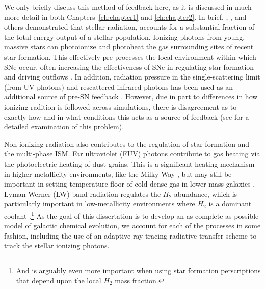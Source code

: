 We only briefly discuss this method of feedback here, as it is discussed in much more detail in both Chapters~\ref{ch:chapter1} and \ref{ch:chapter2}. In brief, \cite{Leitherer1999}, \cite{Agertz2013}, and others demonstrated that stellar radiation, accounts for a substantial fraction of the total energy output of a stellar population. Ionizing photons from young, massive stars can photoionize and photoheat the gas surrounding sites of recent star formation. This effectively pre-processes the local environment within which SNe occur, often increasing the effectiveness of SNe in regulating star formation and driving outflows \citep{Hu2016}. In addition, radiation pressure in the single-scattering limit (from UV photons) and rescattered infrared photons has been used as an additional source of pre-SN feedback \citep[e.g.][]{FIRE}. However, due in part to differences in how ionizing radition is followed across simulations, there is disagreement as to exactly how and in what conditions this acts as a source of feedback (see \cite{Krumholz2018} for a detailed examination of this problem).

Non-ionizing radiation also contributes to the regulation of star formation and the multi-phase ISM. Far ultraviolet (FUV) photons contribute to gas heating via the photoelectric heating of dust grains. This is a significant heating mechanism in higher metallicity environments, like the Milky Way \citep{Parravano2003,Wolfire2003}, but may still be important in setting temperature floor of cold dense gas in lower mass galaxies \citep{Forbes2016,Hu2017}. Lyman-Werner (LW) band radiation regulates the $H_2$ abundance, which is particularly important in low-metallicity environments where $H_2$ is a dominant coolant \citep[e.g.][]{Wolcott-Green2012}.\footnote{And is arguably even more important when using star formation perscriptions that depend upon the local $H_2$ mass fraction.} As the goal of this dissertation is to develop an as-complete-as-possible model of galactic chemical evolution, we account for each of the processes in some fashion, including the use of an adaptive ray-tracing radiative transfer scheme to track the stellar ionizing photons.

%
%
%
%
%
%


